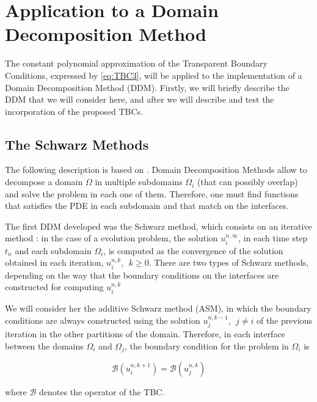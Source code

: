 \section{Application to a Domain Decomposition Method}

\indent The constant polynomial approximation of the Transparent Boundary Conditions, expressed by \ref{eq:TBC3}, will be applied to the implementation of a Domain Decomposition Method (DDM). Firstly, we will briefly describe the DDM that we will consider here, and after we will describe and test the incorporation of the proposed TBCs.

\subsection{The Schwarz Methods}

\indent The following description is based on \cite{Japhet2003}. Domain Decomposition Methods allow to decompose a domain $\Omega$ in multiple subdomains $\Omega_i$ (that can possibly overlap) and solve the problem in each one of them. Therefore, one must find functions that satisfies the PDE in each subdomain and that match on the interfaces. 

\indent The first DDM developed was the Schwarz method, which consists on an iterative method : in the case of a evolution problem, the solution  $u_i^{n,\infty}$, in each time step $t_n$ and each subdomain $\Omega_i$, is computed as the convergence of the solution obtained in each iteration, $u_i^{n,k}, \ \ k\geq 0$. There are two types of Schwarz methods, depending on the way that the boundary conditions on the interfaces are constructed for computing $u_i^{n,k}$

\indent We will consider her the additive Schwarz method (ASM), in which the boundary conditions are always constructed using the solution $u_j^{n,k-1}, \ \ j \neq i$ of the previous iteration in the other partitions of the domain. Therefore, in each interface between the domains $\Omega_i$ and $\Omega_j$, the boundary condition for the problem in $\Omega_i$ is

$$\mathcal{B}(u_i^{n,k+1}) = \mathcal{B}(u_j^{n,k})$$

\noindent where $\mathcal{B}$ denotes the operator of the TBC.


